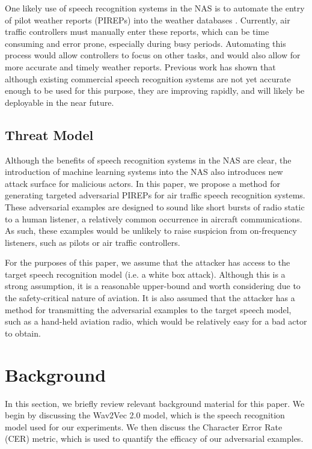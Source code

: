 \documentclass[11pt,a4paper]{article}
\begin{document}
One likely use of speech recognition systems in the NAS is to automate the entry
of pilot weather reports (PIREPs) into the weather databases
\cite{carstens2022accuracy}. Currently, air traffic controllers must manually
enter these reports, which can be time consuming and error prone, especially
during busy periods. Automating this process would allow controllers to focus on
other tasks, and would also allow for more accurate and timely weather reports.
Previous work \cite{carstens2022accuracy} has shown that although existing
commercial speech recognition systems are not yet accurate enough to be used for
this purpose, they are improving rapidly, and will likely be deployable in the
near future.

\subsection{Threat Model}

Although the benefits of speech recognition systems in the NAS are clear, the
introduction of machine learning systems into the NAS also introduces new
attack surface for malicious actors. In this paper, we propose a method for
generating targeted adversarial PIREPs for air traffic speech recognition
systems. These adversarial examples are designed to sound like short bursts of
radio static to a human listener, a relatively common occurrence in aircraft
communications. As such, these examples would be unlikely to raise suspicion
from on-frequency listeners, such as pilots or air traffic controllers.

For the purposes of this paper, we assume that the attacker has access to the
target speech recognition model (i.e. a white box attack). Although this is a
strong assumption, it is a reasonable upper-bound and worth considering due to
the safety-critical nature of aviation. It is also assumed that the attacker has
a method for transmitting the adversarial examples to the target speech model,
such as a hand-held aviation radio, which would be relatively easy for a bad
actor to obtain.

\section{Background}

In this section, we briefly review relevant background material for this paper.
We begin by discussing the Wav2Vec 2.0 model, which is the speech recognition
model used for our experiments. We then discuss the Character Error Rate (CER)
metric, which is used to quantify the efficacy of our adversarial examples.
\end{document}
